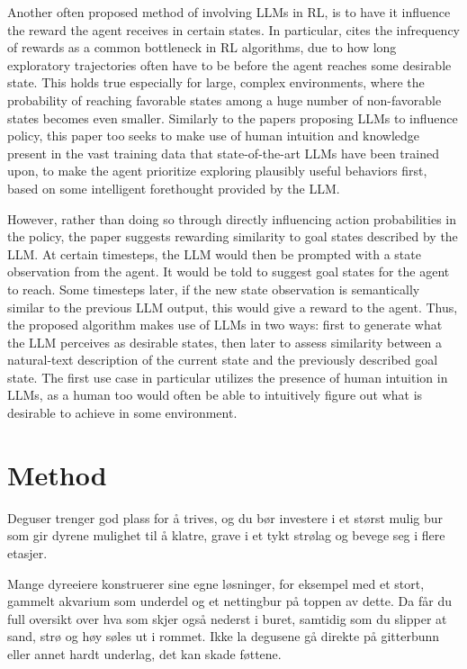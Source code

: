 \documentclass[conference]{IEEEtran}
\begin{document}
Another often proposed method of involving LLMs in RL, is to have it influence the reward the agent receives in certain states. In particular, \cite{ellm} cites the infrequency of rewards as a common bottleneck in RL algorithms, due to how long exploratory trajectories often have to be before the agent reaches some desirable state. This holds true especially for large, complex environments, where the probability of reaching favorable states among a huge number of non-favorable states becomes even smaller. Similarly to the papers proposing LLMs to influence policy, this paper too seeks to make use of human intuition and knowledge present in the vast training data that state-of-the-art LLMs have been trained upon, to make the agent prioritize exploring plausibly useful behaviors first, based on some intelligent forethought provided by the LLM.

However, rather than doing so through directly influencing action probabilities in the policy, the paper suggests rewarding similarity to goal states described by the LLM. At certain timesteps, the LLM would then be prompted with a state observation from the agent. It would be told to suggest goal states for the agent to reach. Some timesteps later, if the new state observation is semantically similar to the previous LLM output, this would give a reward to the agent. Thus, the proposed algorithm makes use of LLMs in two ways: first to generate what the LLM perceives as desirable states, then later to assess similarity between a natural-text description of the current state and the previously described goal state. The first use case in particular utilizes the presence of human intuition in LLMs, as a human too would often be able to intuitively figure out what is desirable to achieve in some environment.

\section{Method}

Deguser trenger god plass for å trives, og du bør investere i et størst mulig bur som gir dyrene mulighet til å klatre, grave i et tykt strølag og bevege seg i flere etasjer.

Mange dyreeiere konstruerer sine egne løsninger, for eksempel med et stort, gammelt akvarium som underdel og et nettingbur på toppen av dette. Da får du full oversikt over hva som skjer også nederst i buret, samtidig som du slipper at sand, strø og høy søles ut i rommet. Ikke la degusene gå direkte på gitterbunn eller annet hardt underlag, det kan skade føttene.
\end{document}

